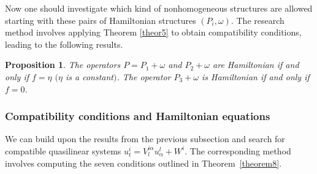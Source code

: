 \documentclass[pdftex]{sigma}
\numberwithin{equation}{section}
\newtheorem{Proposition}[Theorem]{Proposition}
 { \theoremstyle{definition}
\newtheorem{Definition}[Theorem]{Definition}
\newtheorem{Note}[Theorem]{Note}
\newtheorem{Example}[Theorem]{Example}
\newtheorem{Remark}[Theorem]{Remark} }
\begin{document}
Now one should investigate which kind of nonhomogeneous structures are allowed starting with these pairs of Hamiltonian structures $(P_i,\omega)$. The research method involves applying Theorem \ref{theor5} to obtain compatibility conditions, leading to the following results.
\begin{Proposition}
The operators $P=P_1+\omega$ and $P_2+\omega$ are Hamiltonian if and only if $f=\eta$ $(\eta$ is a constant$)$. The operator $P_3+\omega$ is Hamiltonian if and only if $f=0$.
\end{Proposition}

\subsubsection{Compatibility conditions and Hamiltonian equations}\label{sec:res}
We can build upon the results from the previous subsection and search for compatible quasilinear systems $u^i_t=V^{i\alpha}_lu^l_\alpha+W^i$. The corresponding method involves computing the seven conditions outlined in Theorem~\ref{theorem8}.
\end{document}
